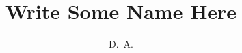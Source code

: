 \documentclass[defaultstyle,12pt]{thesis}
\title{Write Some Name Here}
\author{D.~A.}{McGough}
\begin{document}
 




%


\nocite{*}		%

\appendix
%
%
\end{document}
